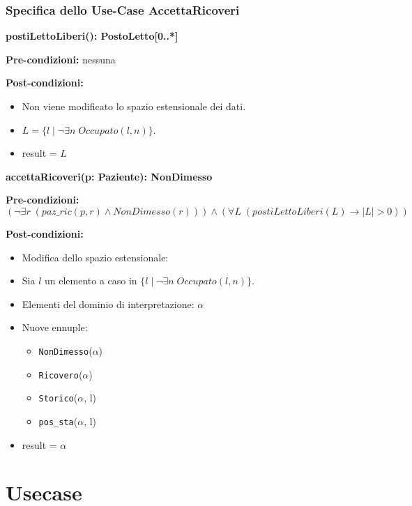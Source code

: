 \documentclass{article}
\begin{document}
\newpage
\subsubsection{Specifica dello Use-Case AccettaRicoveri}

\textbf{postiLettoLiberi(): PostoLetto[0..*]}

\textbf{Pre-condizioni:} nessuna

\textbf{Post-condizioni:}
\begin{itemize}
    \item Non viene modificato lo spazio estensionale dei dati.
    \item \( L = \{l \mid \neg \exists n \; Occupato(l,n)\} \).
    \item result = \( L \)
\end{itemize}

\textbf{accettaRicoveri(p: Paziente): NonDimesso}

\textbf{Pre-condizioni:} 
\[
(\neg \exists r \; (paz\_ric(p,r) \land NonDimesso(r))) \land (\forall L \; (postiLettoLiberi(L) \rightarrow |L| > 0))
\]

\textbf{Post-condizioni:}
\begin{itemize}
    \item Modifica dello spazio estensionale:
    \item Sia \( l \) un elemento a caso in \( \{l \mid \neg \exists n \; Occupato(l,n)\} \).
    \item Elementi del dominio di interpretazione: \( \alpha \)
    \item Nuove ennuple:
    \begin{itemize}
        \item \texttt{NonDimesso}(\(\alpha\))
        \item \texttt{Ricovero}(\(\alpha\))
        \item \texttt{Storico}(\(\alpha\), l)
        \item \texttt{pos\_sta}(\(\alpha\), l)
    \end{itemize}
    \item result = \( \alpha \)
\end{itemize}


\newpage

\section{Usecase}
\end{document}
